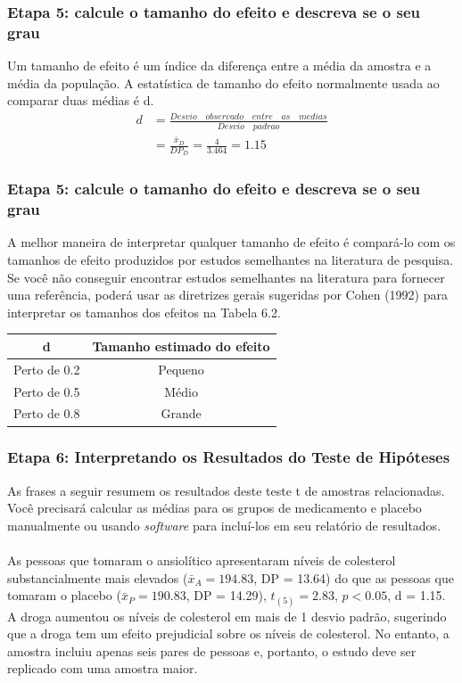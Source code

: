 \documentclass[11pt]{beamer}
\begin{document}
\begin{frame}
\frametitle{Etapa 5: calcule o tamanho do efeito e descreva se o seu grau}
Um tamanho de efeito é um índice da diferença entre a média da amostra e a média da população. A estatística de tamanho do efeito normalmente usada ao comparar duas médias é d. 
\begin{align*}
d &= \frac{Desvio\quad observado\quad entre\quad as\quad medias}{Desvio\quad padrao}\\
  &= \frac{\bar{x}_D}{DP_D} = \frac{4}{3.464} = 1.15
\end{align*}

\end{frame}

\begin{frame}
\frametitle{Etapa 5: calcule o tamanho do efeito e descreva se o seu grau}
A melhor maneira de interpretar qualquer tamanho de efeito é compará-lo com os tamanhos de efeito produzidos por estudos semelhantes na literatura de pesquisa. Se você não conseguir encontrar estudos semelhantes na literatura para fornecer uma referência, poderá usar as diretrizes gerais sugeridas por Cohen (1992) para interpretar os tamanhos dos efeitos na Tabela 6.2.

\begin{center}
\begin{tabular}{cc} 
 \hline
d  & Tamanho estimado do efeito\\
 \hline
Perto de 0.2 & Pequeno \\
Perto de 0.5 & Médio \\
Perto de 0.8 & Grande \\
 \hline
\end{tabular}
\end{center}   

\end{frame}

\begin{frame}
\frametitle{Etapa 6: Interpretando os Resultados do Teste de Hipóteses}

As frases a seguir resumem os resultados deste teste t de amostras relacionadas. Você precisará calcular as médias para os grupos de medicamento e placebo manualmente ou usando \textit{software} para incluí-los em seu relatório de resultados.\\~\\

As pessoas que tomaram o ansiolítico apresentaram níveis de colesterol substancialmente mais elevados (\(\bar{x}_A = 194.83\), DP = 13.64) do que as pessoas que tomaram o placebo (\(\bar{x}_P = 190.83\), DP = 14.29), \(t_{(5)} = 2.83\), \(p < 0.05\), d = 1.15. A droga aumentou os níveis de colesterol em mais de 1 desvio padrão, sugerindo que a droga tem um efeito prejudicial sobre os níveis de colesterol. No entanto, a amostra incluiu apenas seis pares de pessoas e, portanto, o estudo deve ser replicado com uma amostra maior.
\end{frame}
\end{document}
